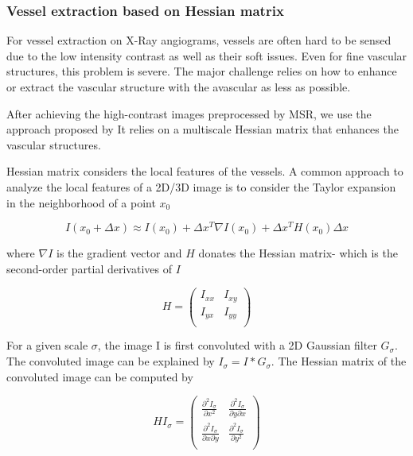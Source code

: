 \subsubsection{Vessel extraction based on Hessian matrix}
For vessel extraction on X-Ray angiograms, vessels are often hard to be
sensed due to the low intensity contrast as well as their soft issues. Even
for fine vascular structures, this problem is severe. The major challenge
relies on how to enhance or extract the vascular structure with the
avascular as less as possible.

After achieving the high-contrast images preprocessed by MSR, we use
the approach proposed by \cite{Frangi}
It relies on a multiscale Hessian matrix that enhances the vascular
structures.


Hessian matrix considers the local features of the vessels.  A common
approach to analyze the local features of a 2D/3D image is to consider
the Taylor expansion in the neighborhood of a point $x_{0}$

\begin{equation}
\label{Taylor}
I(x_{0} + \Delta x) \approx I(x_{0}) + \Delta {x^T} \nabla {I(x_{0})} + \Delta {x^T} H(x_{0}) \Delta x
\end{equation}

where $\nabla I$ is the gradient vector and $H$ donates the Hessian
matrix- which is the second-order partial derivatives of $I$

\begin{equation}
\label{Hessian}
H =
\left(
  \begin{array}{cc}
    I_{xx} & I_{xy}\\
    I_{yx} & I_{yy} \\
  \end{array}
\right)
\end{equation}

For a given scale $\sigma$, the image I is first convoluted with a 2D
Gaussian filter $G_{\sigma}$. The convoluted image can be explained by
$I_{\sigma} = I * G_{\sigma}$. The Hessian matrix of the convoluted
image can be computed by

\begin{equation}\label{Hessian sigma}
HI_{\sigma} =
\left(
  \begin{array}{cc}
    {\frac{\partial^2 I_{\sigma} }{\partial x^2}} & {\frac{\partial^2 I_{\sigma} }{\partial y \partial x}}\\
    {\frac{\partial^2 I_{\sigma} }{\partial x \partial y}} & {\frac{\partial^2 I_{\sigma} }{\partial y^2}} \\
  \end{array}
\right)
\end{equation}

